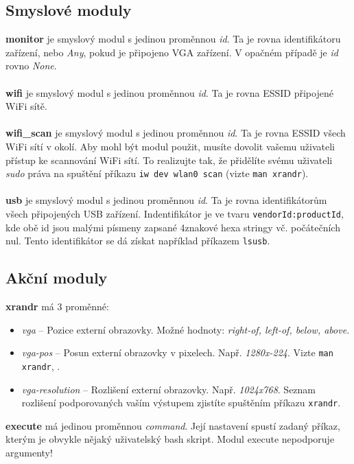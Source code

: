 \documentclass[10pt,a4paper]{article}
\begin{document}
\subsection*{Smyslové moduly}
\textbf{monitor} je smyslový modul s jedinou proměnnou \textit{id}. Ta je rovna identifikátoru zařízení, nebo \textit{Any}, pokud je připojeno VGA zařízení. V opačném případě je \textit{id} rovno \textit{None}. \\
\\
\textbf{wifi} je smyslový modul s jedinou proměnnou \textit{id}. Ta je rovna ESSID připojené WiFi sítě. \\
\\
\textbf{wifi\_scan} je smyslový modul s jedinou proměnnou \textit{id}. Ta je rovna ESSID všech WiFi sítí v okolí. Aby mohl být modul použit, musíte dovolit vašemu uživateli přístup ke scannování WiFi sítí. To realizujte tak, že přidělíte svému uživateli \textit{sudo} práva na spuštění příkazu \texttt{iw dev wlan0 scan} (vizte \texttt{man xrandr}).\\
\\
\textbf{usb} je smyslový modul s jedinou proměnnou \textit{id}. Ta je rovna identifikátorům všech připojených USB zařízení. Indentifikátor je ve tvaru \texttt{vendorId:productId}, kde obě id jsou malými písmeny zapsané 4znakové hexa stringy vč. počátečních nul. Tento identifikátor se dá získat například příkazem \texttt{lsusb}.\\
\subsection*{Akční moduly}
\textbf{xrandr} má 3 proměnné:
\begin{itemize}
    \item \textit{vga} -- Pozice externí obrazovky. Možné hodnoty: \textit{right-of, left-of, below, above}.
    \item \textit{vga-pos} -- Posun externí obrazovky v pixelech. Např. \textit{1280x-224}. Vizte \texttt{man xrandr}, .
    \item \textit{vga-resolution} -- Rozlišení externí obrazovky. Např. \textit{1024x768}. Seznam rozlišení podporovaných vaším výstupem zjistíte spuštěním příkazu \texttt{xrandr}.
\end{itemize}

\textbf{execute} má jedinou proměnnou \textit{command}. Její nastavení spustí zadaný příkaz, kterým je obvykle nějaký uživatelský bash skript. Modul execute nepodporuje argumenty! \\
\end{document}
